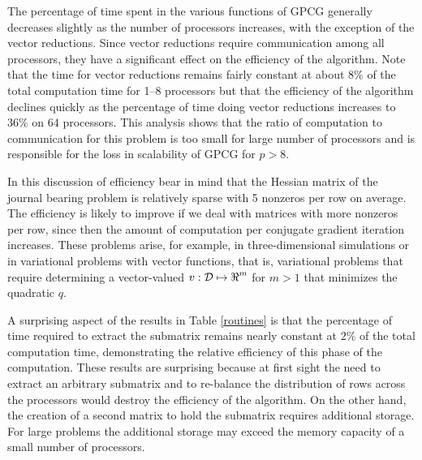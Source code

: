 The percentage of time spent in the various functions
of GPCG generally decreases slightly as the number of processors increases,
with the exception of the vector reductions.
Since vector reductions require
communication among all processors, they have a significant effect
on the efficiency of the algorithm.
Note that the time for vector reductions
remains fairly constant at about $8\%$ of the total computation
time for \mbox{1--8} processors but that the
efficiency of the algorithm declines
quickly as the percentage of time doing vector reductions
increases to $36\%$ on $64$ processors.
This analysis shows that 
the ratio of computation to communication for this problem is too small
for large number of processors and is responsible for
the loss in scalability of GPCG for $ p > 8 $.

In this discussion of efficiency bear in mind
that the Hessian matrix of the journal bearing problem is relatively
sparse with 5 nonzeros per row on average. 
The efficiency is likely to improve if we deal with
matrices with more nonzeros per row,
since then the amount of computation per conjugate gradient iteration 
increases.
These problems arise, for example,
in three-dimensional simulations or in variational
problems with vector functions, that is, variational
problems that require determining a vector-valued
$ v : \cD \mapsto \R^m $ for $ m > 1 $ that minimizes the quadratic $q$.


A surprising aspect of the results in Table \ref{routines} is that
the percentage of time
required to extract the submatrix remains nearly constant
at $2\%$ of the total computation time, demonstrating the relative 
efficiency of this phase of the computation.
These results are surprising because at first sight the need to
extract an arbitrary submatrix and to re-balance the distribution of
rows across the processors would destroy the efficiency of the algorithm.
On the other hand, the creation of a second matrix to 
hold the submatrix requires
additional storage.  For large problems the additional storage
may exceed the memory capacity of a small number of processors.

